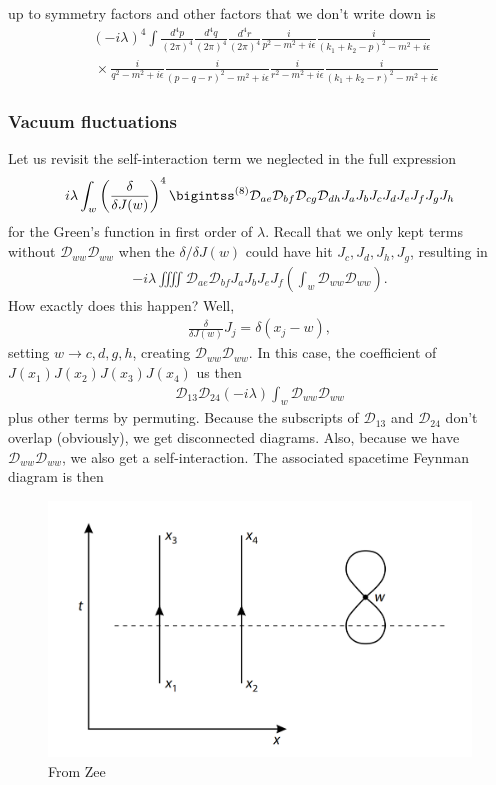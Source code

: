 \documentclass{book}
\theoremstyle{definition}
\newcommand{\f}[2]{\frac{#1}{#2}}
\newcommand{\lp}{\left(}
\newcommand{\rp}{\right)}
\newcommand{\D}{\mathcal{D}}
\begin{document}
up to symmetry factors and other factors that we don't write down is 
\begin{align}
&(-i\lambda)^4 \int \f{d^4p}{(2\pi)^4}\f{d^4q}{(2\pi)^4}\f{d^4r}{(2\pi)^4} \f{i}{p^2-m^2 +i\epsilon}\f{i}{(k_1+k_2-p)^2-m^2 +i\epsilon}\nonumber\\ &\,\times\f{i}{q^2-m^2 +i\epsilon}\f{i}{(p-q-r)^2-m^2 +i\epsilon}\f{i}{r^2-m^2+i\epsilon}\f{i}{(k_1+k_2-r)^2-m^2 +i\epsilon}
\end{align}





\subsubsection{Vacuum fluctuations}


Let us revisit the self-interaction term we neglected in the full expression 
\begin{align}
i\lambda \int_w \lp \f{\delta}{\delta J(w)} \rp^4 \bigintss^{(8)}  \D_{ae}\D_{bf}\D_{cg}\D_{dh}J_aJ_bJ_cJ_dJ_eJ_fJ_gJ_h
\end{align}
for the Green's function in first order of $\lambda$. Recall that we only kept terms without $\D_{ww}\D_{ww}$ when the $\delta/\delta J(w)$ could have hit $J_c, J_d, J_h, J_g$, resulting in
\begin{align}
-i\lambda \iiiint \D_{ae}\D_{bf} J_a J_b J_eJ_f \lp \int_w \D_{ww}\D_{ww} \rp.
\end{align}
How exactly does this happen? Well,
\begin{align}
\f{\delta}{\delta J(w)}J_j = \delta(x_j - w),
\end{align}
setting $w \to c,d,g,h$, creating $\D_{ww}\D_{ww}$. In this case, the coefficient of $J(x_1)J(x_2)J(x_3)J(x_4)$ us then
\begin{align}
\D_{13}\D_{24} (-i\lambda)\int_w \D_{ww}\D_{ww}
\end{align}
plus other terms by permuting. Because the subscripts of $\D_{13}$ and $\D_{24}$ don't overlap (obviously), we get disconnected diagrams. Also, because we have $\D_{ww}\D_{ww}$, we also get a self-interaction. The associated spacetime Feynman diagram is then
\begin{figure}[!htb]
	\centering
	\includegraphics[scale=0.3]{self-int}
	\caption{From Zee}
\end{figure}
\end{document}
